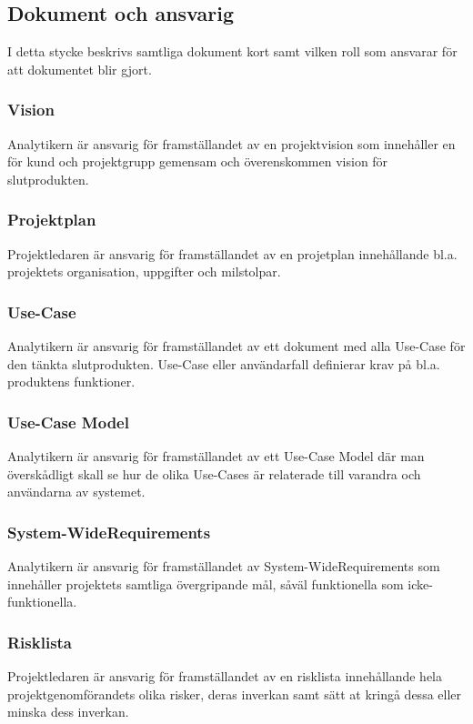 \subsection{Dokument och ansvarig}
I detta stycke beskrivs samtliga dokument kort samt vilken roll som ansvarar för att dokumentet blir gjort.

\subsubsection{Vision}
Analytikern är ansvarig för framställandet av en projektvision som innehåller en för kund och projektgrupp gemensam och överenskommen vision för slutprodukten.

\subsubsection{Projektplan}
Projektledaren är ansvarig för framställandet av en projetplan innehållande bl.a. projektets organisation, uppgifter och milstolpar.

\subsubsection{Use-Case}
Analytikern är ansvarig för framställandet av ett dokument med alla Use-Case för den tänkta slutprodukten. Use-Case eller användarfall definierar krav på bl.a. produktens funktioner.

\subsubsection{Use-Case Model}
Analytikern är ansvarig för framställandet av ett Use-Case Model där man överskådligt skall se hur de olika Use-Cases är relaterade till varandra och användarna av systemet.

\subsubsection{System-WideRequirements}
Analytikern är ansvarig för framställandet av System-WideRequirements som innehåller projektets samtliga övergripande mål, såväl funktionella som icke-funktionella.

\subsubsection{Risklista}
Projektledaren är ansvarig för framställandet av en risklista innehållande hela projektgenomförandets olika risker, deras inverkan samt sätt at kringå dessa eller minska dess inverkan.

